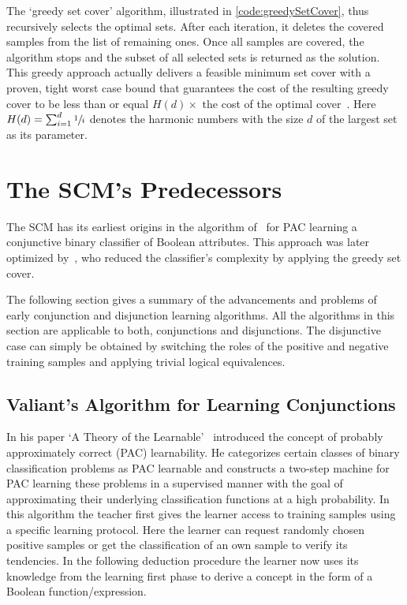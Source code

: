 The `greedy set cover' algorithm, illustrated in \autoref{code:greedySetCover}, thus recursively selects the optimal sets.
After each iteration, it deletes the covered samples from the list of remaining ones.
Once all samples are covered, the algorithm stops and the subset of all selected sets is returned as the solution.
This greedy approach actually delivers a feasible minimum set cover with a proven, tight worst case bound that guarantees the
cost of the resulting greedy cover to be less than or equal \(H(d) \times \) the cost of the optimal cover~\citep{chvatal}.
Here \( H(d) = \sum_{i=1}^d \sfrac{1}{i} \) denotes the harmonic numbers with the size \(d\) of the largest set as its parameter.

\section{The SCM's Predecessors}\label{sec:origin}

The SCM has its earliest origins in the algorithm of~\cite{valiant} for PAC learning a conjunctive binary classifier of Boolean attributes.
This approach was later optimized by~\cite{haussler88}, who reduced the classifier's complexity by applying the greedy set cover.

The following section gives a summary of the advancements and problems of early conjunction and disjunction learning algorithms.
All the algorithms in this section are applicable to both, conjunctions and disjunctions.
The disjunctive case can simply be obtained by switching the roles of the positive and negative training samples and applying trivial logical equivalences.

\subsection{Valiant's Algorithm for Learning Conjunctions}

In his paper `A Theory of the Learnable'~\cite{valiant} introduced the concept of probably approximately correct (PAC) learnability.
He categorizes certain classes of binary classification problems as PAC learnable and constructs a two-step machine for PAC learning these problems in a supervised manner
with the goal of approximating their underlying classification functions at a high probability.
In this algorithm the teacher first gives the learner access to training samples using a specific learning protocol.
Here the learner can request randomly chosen positive samples or get the classification of an own sample to verify its tendencies.
In the following deduction procedure the learner now uses its knowledge from the learning first phase to derive a concept in the form of a Boolean function/expression.


